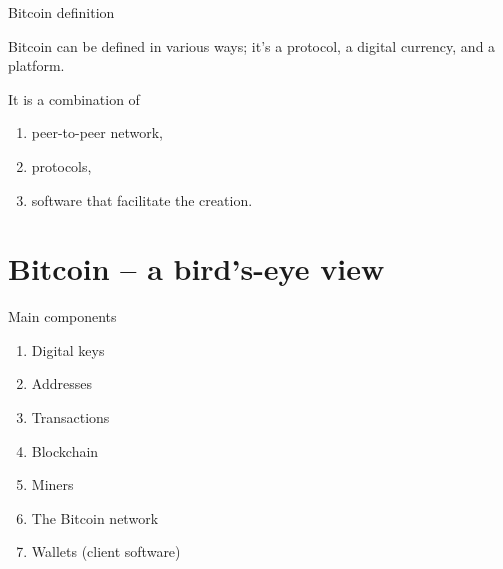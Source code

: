 \documentclass[serif]{beamer}
\begin{document}
\begin{frame}{Bitcoin definition}
	\begin{definition}[Bitcoin]
			Bitcoin can be defined in various ways; it's a protocol, a digital currency, and a platform.
	\end{definition}
	It is a combination of
	\begin{enumerate}
		\item peer-to-peer network,
		\item protocols,
		\item  software that facilitate the creation.   
	\end{enumerate}

\end{frame}
\section{Bitcoin – a bird's-eye view}
\begin{frame}{Main components}
	\begin{enumerate}
		\item Digital keys
		\item Addresses
		\item Transactions
		\item Blockchain
		\item Miners
		\item The Bitcoin network
		\item Wallets (client software)
	\end{enumerate}
\end{frame}
\end{document}
